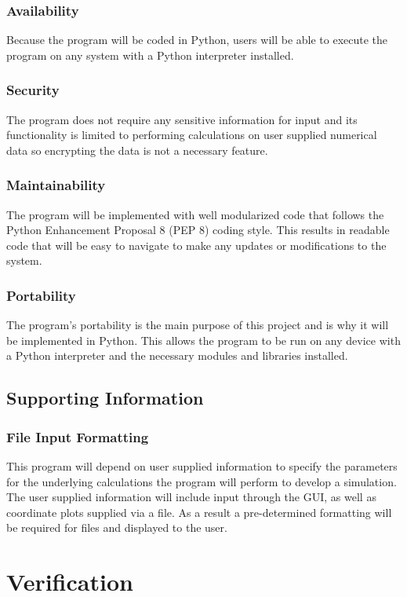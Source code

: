 \documentclass[draftclsnofoot,onecolumn,letterpaper,10pt,compsoc]{IEEEtran}
\begin{document}
\subsubsection{Availability}
Because the program will be coded in Python, users will be able to execute the program on any system with a Python interpreter installed.

\subsubsection{Security}
The program does not require any sensitive information for input and its functionality is limited to performing calculations on user supplied numerical data so encrypting the data is not a necessary feature.

\subsubsection{Maintainability}
The program will be implemented with well modularized code that follows the Python Enhancement Proposal 8 (PEP 8) coding style. This results in readable code that will be easy to navigate to make any updates or modifications to the system.

\subsubsection{Portability}
The program's portability is the main purpose of this project and is why it will be implemented in Python. This allows the program to be run on any device with a Python interpreter and the necessary modules and libraries installed.

\subsection{Supporting Information}
\subsubsection{File Input Formatting}
This program will depend on user supplied information to specify the parameters for the underlying calculations the program will perform to develop a simulation. The user supplied information will include input  through the GUI, as well as coordinate plots supplied via a file. As a result a pre-determined formatting will be required for files and displayed to the user.

\section{Verification}
\end{document}
